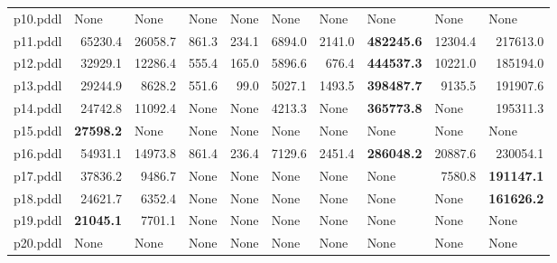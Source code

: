 \documentclass{article}
\begin{document}
\begin{tabular}{@{}lrrrrrrrrr@{}}
p10.pddl & \multicolumn{1}{|l|}{None} & \multicolumn{1}{|l|}{None} & \multicolumn{1}{|l|}{None} & \multicolumn{1}{|l|}{None} & \multicolumn{1}{|l|}{None} & \multicolumn{1}{|l|}{None} & \multicolumn{1}{|l|}{None} & \multicolumn{1}{|l|}{None} & \multicolumn{1}{|l|}{None} \\
p11.pddl & 65230.4 & 26058.7 & 861.3 & 234.1 & 6894.0 & 2141.0 & \textbf{482245.6} & 12304.4 & 217613.0 \\
p12.pddl & 32929.1 & 12286.4 & 555.4 & 165.0 & 5896.6 & 676.4 & \textbf{444537.3} & 10221.0 & 185194.0 \\
p13.pddl & 29244.9 & 8628.2 & 551.6 & 99.0 & 5027.1 & 1493.5 & \textbf{398487.7} & 9135.5 & 191907.6 \\
p14.pddl & 24742.8 & 11092.4 & \multicolumn{1}{|l|}{None} & \multicolumn{1}{|l|}{None} & 4213.3 & \multicolumn{1}{|l|}{None} & \textbf{365773.8} & \multicolumn{1}{|l|}{None} & 195311.3 \\
p15.pddl & \textbf{27598.2} & \multicolumn{1}{|l|}{None} & \multicolumn{1}{|l|}{None} & \multicolumn{1}{|l|}{None} & \multicolumn{1}{|l|}{None} & \multicolumn{1}{|l|}{None} & \multicolumn{1}{|l|}{None} & \multicolumn{1}{|l|}{None} & \multicolumn{1}{|l|}{None} \\
p16.pddl & 54931.1 & 14973.8 & 861.4 & 236.4 & 7129.6 & 2451.4 & \textbf{286048.2} & 20887.6 & 230054.1 \\
p17.pddl & 37836.2 & 9486.7 & \multicolumn{1}{|l|}{None} & \multicolumn{1}{|l|}{None} & \multicolumn{1}{|l|}{None} & \multicolumn{1}{|l|}{None} & \multicolumn{1}{|l|}{None} & 7580.8 & \textbf{191147.1} \\
p18.pddl & 24621.7 & 6352.4 & \multicolumn{1}{|l|}{None} & \multicolumn{1}{|l|}{None} & \multicolumn{1}{|l|}{None} & \multicolumn{1}{|l|}{None} & \multicolumn{1}{|l|}{None} & \multicolumn{1}{|l|}{None} & \textbf{161626.2} \\
p19.pddl & \textbf{21045.1} & 7701.1 & \multicolumn{1}{|l|}{None} & \multicolumn{1}{|l|}{None} & \multicolumn{1}{|l|}{None} & \multicolumn{1}{|l|}{None} & \multicolumn{1}{|l|}{None} & \multicolumn{1}{|l|}{None} & \multicolumn{1}{|l|}{None} \\
p20.pddl & \multicolumn{1}{|l|}{None} & \multicolumn{1}{|l|}{None} & \multicolumn{1}{|l|}{None} & \multicolumn{1}{|l|}{None} & \multicolumn{1}{|l|}{None} & \multicolumn{1}{|l|}{None} & \multicolumn{1}{|l|}{None} & \multicolumn{1}{|l|}{None} & \multicolumn{1}{|l|}{None} \\
\end{tabular}
\end{document}
